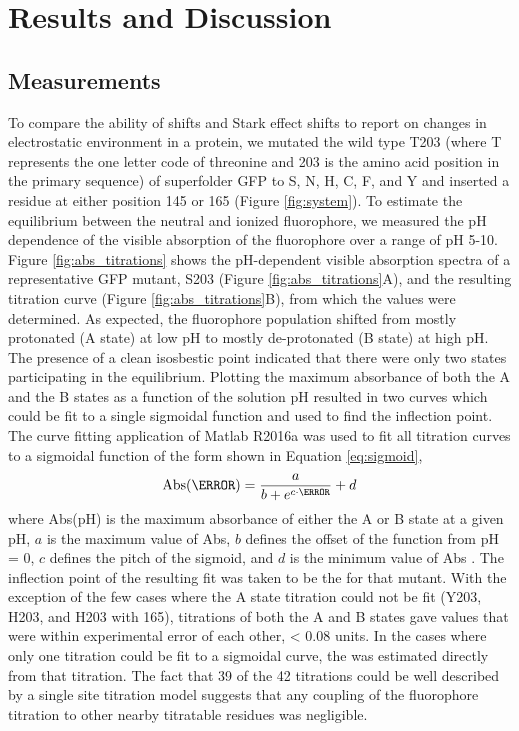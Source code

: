 \section{Results and Discussion} \label{pKa-results}

\subsection{\pKa{} Measurements}

To compare the ability of \pKa{} shifts and Stark effect shifts to report on changes in electrostatic environment in a protein, we mutated the wild type T203 (where T represents the one letter code of threonine and 203 is the amino acid position in the primary sequence) of superfolder GFP to S, N, H, C, F, and Y and inserted a \pCNF{} residue at either position 145 or 165 (Figure \ref{fig:system}). 
To estimate the equilibrium between the neutral and ionized fluorophore, we measured the pH dependence of the visible absorption of the fluorophore over a range of pH 5-10.  
Figure \ref{fig:abs_titrations} shows the pH-dependent visible absorption spectra of a representative GFP mutant, S203 (Figure \ref{fig:abs_titrations}A), and the resulting titration curve (Figure \ref{fig:abs_titrations}B), from which the \pKa{} values were determined. 
As expected, the fluorophore population shifted from mostly protonated (A state) at low pH to mostly de-protonated (B state) at high pH.
The presence of a clean isosbestic point indicated that there were only two states participating in the equilibrium.
Plotting the maximum absorbance of both the A and the B states as a function of the solution pH resulted in two curves which could be fit to a single sigmoidal function and used to find the inflection point.
The curve fitting application of Matlab R2016a was used to fit all titration curves to a sigmoidal function of the form shown in Equation \ref{eq:sigmoid},
\begin{equation}
    \text{Abs}(\pH) = \frac{a}{b+e^{c\cdot\pH}}+d
    \label{eq:sigmoid}
\end{equation}
where Abs(pH) is the maximum absorbance of either the A or B state at a given pH, $a$ is the maximum value of Abs, $b$ defines the offset of the function from pH = 0, $c$ defines the pitch of the sigmoid, and $d$ is the minimum value of Abs \cite{Matlab2016}.
The inflection point of the resulting fit was taken to be the \pKa{} for that mutant.
With the exception of the few cases where the A state titration could not be fit (Y203, H203, and H203 with \pCNF{} 165), titrations of both the A and B states gave \pKa{} values that were within experimental error of each other, < 0.08 \pKa{} units.
In the cases where only one titration could be fit to a sigmoidal curve, the \pKa{} was estimated directly from that titration.
The fact that 39 of the 42 titrations could be well described by a single site titration model suggests that any coupling of the fluorophore titration to other nearby titratable residues was negligible. 

